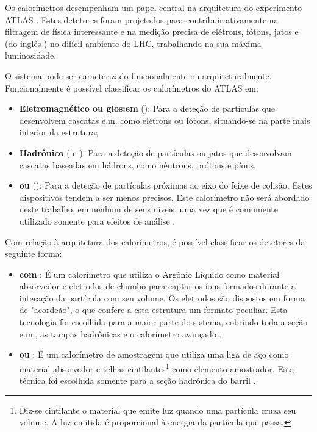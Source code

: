 Os calorímetros desempenham um papel central na arquitetura do experimento
ATLAS \cite{atlas-calo-tpr}. Estes detetores foram projetados para contribuir
ativamente na filtragem de física interessante e na medição precisa de
elétrons, fótons, jatos e  (do inglês
) no difícil ambiente do LHC, trabalhando na sua
máxima luminosidade.

O sistema pode ser caracterizado funcionalmente ou
arquiteturalmente. Funcionalmente é possível classificar os calorímetros do
ATLAS em:

\begin{itemize}
\item \textbf{Eletromagnético ou \gls{glos:em}} (): Para a deteção de partículas que desenvolvem cascatas
e.m. como elétrons ou fótons, situando-se na parte mais interior da estrutura;

\item \textbf{Hadrônico} ( e ): Para a deteção de partículas ou jatos que desenvolvam
cascatas baseadas em hádrons, como nêutrons, prótons e píons.

\item \textbf{ ou } (): Para a deteção de partículas próximas ao eixo do feixe de
colisão. Estes dispositivos tendem a ser menos precisos. Este calorímetro não
será abordado neste trabalho, em nenhum de seus níveis, uma vez que é
comumente utilizado somente para efeitos de análise
.
\end{itemize}

Com relação à arquitetura dos calorímetros, é possível classificar os
detetores da seguinte forma:

\begin{itemize}
\item \textbf{ com }: É um
calorímetro que utiliza o Argônio Líquido como material absorvedor e eletrodos
de chumbo para captar os íons formados durante a interação da partícula com
seu volume. Os eletrodos são dispostos em forma de "acordeão", o que confere a
esta estrutura um formato peculiar. Esta tecnologia foi escolhida para a maior
parte do sistema, cobrindo toda a seção e.m., as tampas hadrônicas e o
calorímetro avançado \cite{lar-tdr}.

\item \textbf{ ou }: É um
calorímetro de amostragem que utiliza uma liga de aço como material absorvedor
e telhas cintilantes\footnote{Diz-se cintilante o material que emite luz
quando uma partícula cruza seu volume. A luz emitida é proporcional à energia
da partícula que passa.} como elemento amostrador. Esta técnica foi escolhida
somente para a seção hadrônica do barril \cite{tilecal}.
\end{itemize}

